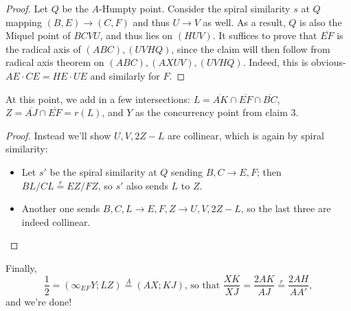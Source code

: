 \documentclass{seto}
\begin{document}
\begin{proof} Let $Q$ be the $A$-Humpty point. Consider the spiral similarity $s$ at $Q$ mapping $(B,E)\to (C,F)$ and thus $U\to V$ as well.  
As a result, $Q$ is also the Miquel point of $BCVU$, and thus lies on $(HUV)$. 
It suffices to prove that $\overline{EF}$ is the radical axis of $(ABC), (UVHQ)$, since the claim will then follow from radical axis theorem on $(ABC), (AXUV), (UVHQ)$. 
Indeed, this is obvious- $AE\cdot CE=HE\cdot UE$ and similarly for $F$.\end{proof}
At this point, we add in a few intersections: $L=\overline{AK}\cap\overline{EF}\cap\overline{BC}$, $Z=\overline{AJ}\cap\overline{EF}=r(L)$, and $Y$ as the concurrency point from claim 3.
\begin{proof} Instead we'll show $U,V,2Z-L$ are collinear, which is again by spiral similarity:\begin{itemize}
\item Let $s'$ be the spiral similarity at $Q$ sending $B,C\to E,F$; then $BL/CL\overset r=EZ/FZ$, so $s'$ also sends $L$ to $Z$.
\item Another one sends $B,C,L\to E,F,Z\to U,V,2Z-L$, so the last three are indeed collinear.\qedhere
\end{itemize}\end{proof}
Finally,
\[\frac12=(\infty_{EF}Y;LZ)\overset A=(AX;KJ)\text{, so that }\frac{XK}{XJ}=\frac{2AK}{AJ}\overset r=\frac{2AH}{AA'},\]
and we're done!
\end{document}

